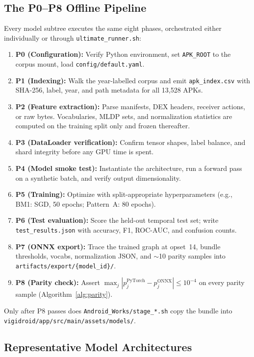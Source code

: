 \subsection{The P0--P8 Offline Pipeline}
Every model subtree executes the same eight phases, orchestrated either individually or through \texttt{ultimate\_runner.sh}:
\begin{enumerate}
 \item \textbf{P0 (Configuration):} Verify Python environment, set \texttt{APK\_ROOT} to the corpus mount, load \texttt{config/default.yaml}.
 \item \textbf{P1 (Indexing):} Walk the year-labelled corpus and emit \texttt{apk\_index.csv} with SHA-256, label, year, and path metadata for all 13,528 APKs.
 \item \textbf{P2 (Feature extraction):} Parse manifests, DEX headers, receiver actions, or raw bytes. Vocabularies, MLDP sets, and normalization statistics are computed on the training split only and frozen thereafter.
 \item \textbf{P3 (DataLoader verification):} Confirm tensor shapes, label balance, and shard integrity before any GPU time is spent.
 \item \textbf{P4 (Model smoke test):} Instantiate the architecture, run a forward pass on a synthetic batch, and verify output dimensionality.
 \item \textbf{P5 (Training):} Optimize with split-appropriate hyperparameters (e.g., BM1: SGD, 50 epochs; Pattern~A: 80 epochs).
 \item \textbf{P6 (Test evaluation):} Score the held-out temporal test set; write \texttt{test\_results.json} with accuracy, F1, ROC-AUC, and confusion counts.
 \item \textbf{P7 (ONNX export):} Trace the trained graph at opset~14, bundle thresholds, vocabs, normalization JSON, and $\sim$10 parity samples into \texttt{artifacts/export/\{model\_id\}/}.
 \item \textbf{P8 (Parity check):} Assert $\max_j |p_j^{\mathrm{PyTorch}} - p_j^{\mathrm{ONNX}}| \leq 10^{-4}$ on every parity sample (Algorithm~\ref{alg:parity}).
\end{enumerate}
Only after P8 passes does \texttt{Android\_Works/stage\_*.sh} copy the bundle into \texttt{vigidroid/app/src/main/assets/models/}.

\subsection{Representative Model Architectures}
